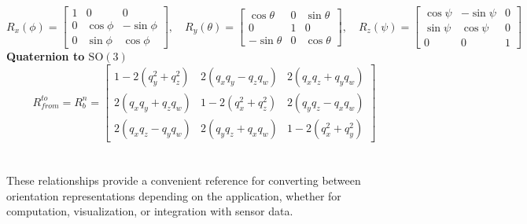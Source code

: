 $$
    R_x(\phi) =
    \begin{bmatrix}
        1 & 0 & 0 \\
        0 & \cos\phi & -\sin\phi \\
        0 & \sin\phi & \cos\phi
    \end{bmatrix}, \quad
    R_y(\theta) =
    \begin{bmatrix}
        \cos\theta & 0 & \sin\theta \\
        0 & 1 & 0 \\
        -\sin\theta & 0 & \cos\theta
    \end{bmatrix}, \quad
    R_z(\psi) =
    \begin{bmatrix}
        \cos\psi & -\sin\psi & 0 \\
        \sin\psi & \cos\psi & 0 \\
        0 & 0 & 1
    \end{bmatrix}
$$
\textbf{Quaternion to $\mathrm{SO}(3)$}
$$
    R_{from}^{to} = R_{b}^{n} =
    \begin{bmatrix}
        1 - 2(q_y^2 + q_z^2) & 2(q_x q_y - q_z q_w) & 2(q_x q_z + q_y q_w) \\
        2(q_x q_y + q_z q_w) & 1 - 2(q_x^2 + q_z^2) & 2(q_y q_z - q_x q_w) \\
        2(q_x q_z - q_y q_w) & 2(q_y q_z + q_x q_w) & 1 - 2(q_x^2 + q_y^2)
    \end{bmatrix}
$$
\\ \\
\noindent
These relationships provide a convenient reference for converting between orientation representations depending on the application, whether for computation, visualization, or integration with sensor data.
